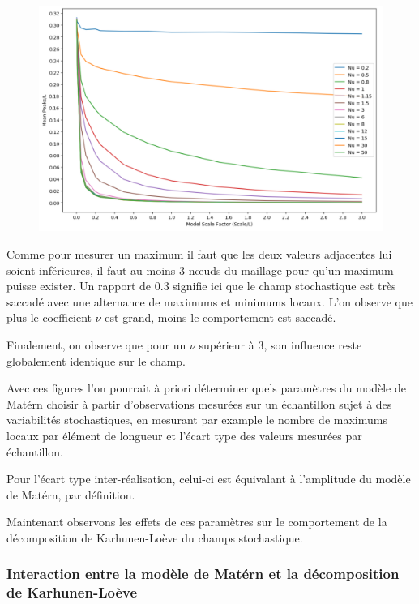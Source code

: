 \documentclass[a4paper,10pt]{article}
\begin{document}
\begin{figure}[H]
   \centering   
   \noindent \includegraphics[width = \linewidth]{peakScale.png}
      \caption{}
         \label{peakScale}
\end{figure}

Comme pour mesurer un maximum il faut que les deux valeurs adjacentes lui soient inférieures, il faut au moins 3 nœuds du maillage pour qu'un maximum puisse exister. Un rapport de 0.3 signifie ici que le champ stochastique est très saccadé avec une alternance de maximums et minimums locaux. L'on observe que plus le coefficient $\nu$ est grand, moins le comportement est saccadé. \par \bigskip

Finalement, on observe que pour un $\nu$ supérieur à 3, son influence reste globalement identique sur le champ. \par \smallskip

Avec ces figures l'on pourrait à priori déterminer quels paramètres du modèle de Matérn choisir à partir d'observations mesurées sur un échantillon sujet à des variabilités stochastiques, en mesurant par example le nombre de maximums locaux par élément de longueur et l'écart type des valeurs mesurées par échantillon. \par \smallskip 

Pour l’écart type inter-réalisation, celui-ci est équivalant à l'amplitude du modèle de Matérn, par définition.  \par

Maintenant observons les effets de ces paramètres sur le comportement de la décomposition de Karhunen-Loève du champs stochastique. 

\subsubsection{Interaction entre la modèle de Matérn et la décomposition de Karhunen-Loève}
\end{document}
